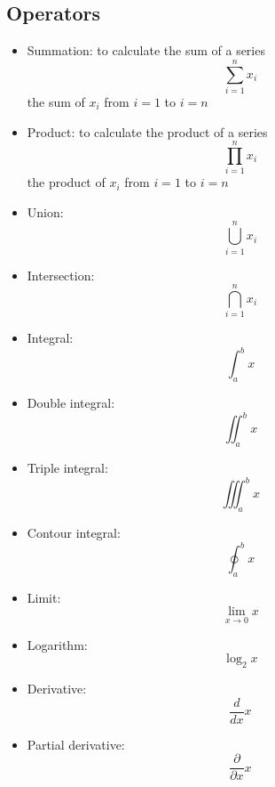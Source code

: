 \documentclass{article}
\begin{document}
\subsection{Operators}
\begin{itemize}
    \item Summation: to calculate the sum of a series
          \[\sum_{i=1}^{n} x_{i}\] the sum of \(x_{i}\) from \(i=1\) to \(i=n\)
    \item Product: to calculate the product of a series
          \[\prod_{i=1}^{n} x_{i}\] the product of \(x_{i}\) from \(i=1\) to \(i=n\)
    \item Union: \[\bigcup_{i=1}^{n} x_{i}\]
    \item Intersection: \[\bigcap_{i=1}^{n} x_{i}\]
    \item Integral: \[\int_{a}^{b} x\]
    \item Double integral: \[\iint_{a}^{b} x\]
    \item Triple integral: \[\iiint_{a}^{b} x\]
    \item Contour integral: \[\oint_{a}^{b} x\]
    \item Limit: \[\lim_{x \to 0} x\]
    \item Logarithm: \[\log_{2} x\]
    \item Derivative: \[\frac{d}{dx} x\]
    \item Partial derivative: \[\frac{\partial}{\partial x} x\]
\end{itemize}
\end{document}
